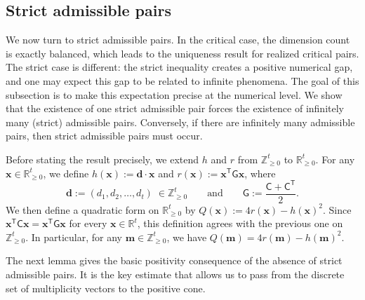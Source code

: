 \documentclass[a4,12pt]{amsart}
\numberwithin{equation}{section} %
\theoremstyle{definition} %
\begin{document}
\subsection{Strict admissible pairs} 
We now turn to strict admissible pairs. In the critical case, the dimension count is exactly balanced, which leads to the uniqueness result for realized critical pairs. The strict case is different: the strict inequality creates a positive numerical gap, and one may expect this gap to be related to infinite phenomena. The goal of this subsection is to make this expectation precise at the numerical level. We show that the existence of one strict admissible pair forces the existence of infinitely many (strict) admissible pairs. Conversely, if there are infinitely many admissible pairs, then strict admissible pairs must occur. 

Before stating the result precisely, we extend $h$ and $r$ from $\mathbb{Z}_{\geq 0}^t$ to $\mathbb{R}_{\geq 0}^t$. For any $\mathbf{x}\in \mathbb{R}_{\geq 0}^t$, we define $h(\mathbf{x}):=\mathbf{d}\cdot\mathbf{x}$ and $r(\mathbf{x}):=\mathbf{x}^{\mathsf{T}}\mathsf{G}\mathbf{x}$, where
\[
\mathbf{d}:=(d_1,d_2,\ldots,d_t) \; \in \mathbb{Z}_{\geq 0}^t
\qquad\text{and}\qquad
\mathsf{G}:=\frac{\mathsf{C}+\mathsf{C}^{\mathsf{T}}}{2}.
\] 
We then define a quadratic form on $\mathbb{R}_{\geq 0}^t$ by $Q(\mathbf{x}):=4r(\mathbf{x})-h(\mathbf{x})^2$. Since $\mathbf{x}^{\mathsf{T}}\mathsf{C}\mathbf{x}
=
\mathbf{x}^{\mathsf{T}}\mathsf{G}\mathbf{x}$ for every
$\mathbf{x}\in\mathbb{R}^t$, this definition agrees with the previous one on $\mathbb{Z}_{\geq 0}^t$. In particular, for any $\mathbf{m}\in\mathbb{Z}_{\geq 0}^t$, we have $Q(\mathbf{m})=4r(\mathbf{m})-h(\mathbf{m})^2$. 

The next lemma gives the basic positivity consequence of the absence of strict admissible pairs. It is the key estimate that allows us to pass from the discrete set of multiplicity vectors to the positive cone.
\end{document}
